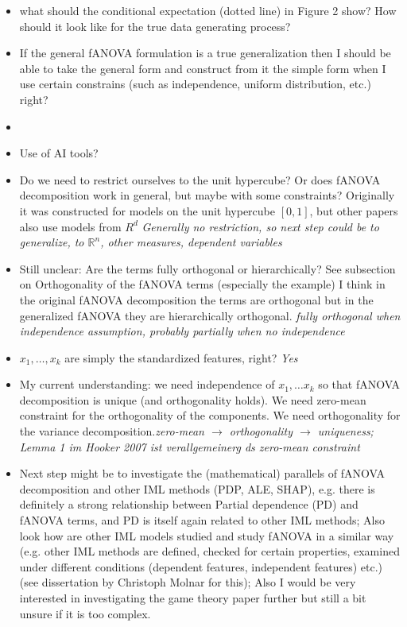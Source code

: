 \begin{itemize}
    \item \cite{hooker2007} what should the conditional expectation (dotted line) in Figure 2 show? How should it look like for the true data generating process?
    \item If the general fANOVA formulation is a true generalization then I should be able to take the general form and construct from it the simple form when I use certain constrains (such as independence, uniform distribution, etc.) right?
    \item 
    \item Use of AI tools?
    \item Do we need to restrict ourselves to the unit hypercube? Or does fANOVA decomposition work in general, but maybe with some constraints? Originally it was constructed for models on the unit hypercube $[0,1]$, but other papers also use models from $R^d$ \textit{Generally no restriction, so next step could be to generalize, to $\mathbb{R}^n$, other measures, dependent variables}
    \item Still unclear: Are the terms fully orthogonal or hierarchically? See subsection on Orthogonality of the fANOVA terms (especially the example) I think in the original fANOVA decomposition the terms are orthogonal but in the generalized fANOVA \citep{hooker2007} they are hierarchically orthogonal. \textit{fully orthogonal when independence assumption, probably partially when no independence}
    \item $x_1, \dots, x_k$ are simply the standardized features, right? \textit{Yes}
    \item {\color{orange}My current understanding: we need independence of $x_1, \dots x_k$ so that fANOVA decomposition is unique (and orthogonality holds). We need zero-mean constraint for the orthogonality of the components. We need orthogonality for the variance decomposition.}\textit{zero-mean $\rightarrow$ orthogonality $\rightarrow$ uniqueness; Lemma 1 im Hooker 2007 ist verallgemeinerg ds zero-mean constraint}
    \item Next step might be to investigate the (mathematical) parallels of fANOVA decomposition and other IML methods (PDP, ALE, SHAP), e.g. there is definitely a strong relationship between Partial dependence (PD) and fANOVA terms, and PD is itself again related to other IML methods; Also look how are other IML models studied and study fANOVA in a similar way (e.g. other IML methods are defined, checked for certain properties, examined under different conditions (dependent features, independent features) etc.) (see dissertation by Christoph Molnar for this); Also I would be very interested in investigating the game theory paper further \citep{fumagalli2025} but still a bit unsure if it is too complex.

\end{itemize}
